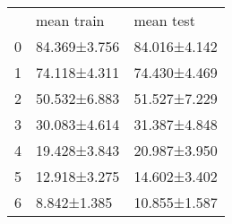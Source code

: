 \begin{tabular}{lll}
 & mean train & mean test \\
0 & 84.369±3.756 & 84.016±4.142 \\
1 & 74.118±4.311 & 74.430±4.469 \\
2 & 50.532±6.883 & 51.527±7.229 \\
3 & 30.083±4.614 & 31.387±4.848 \\
4 & 19.428±3.843 & 20.987±3.950 \\
5 & 12.918±3.275 & 14.602±3.402 \\
6 & 8.842±1.385 & 10.855±1.587 \\
\end{tabular}
